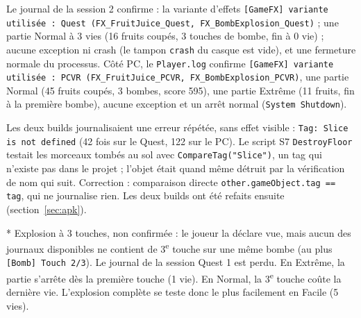 \documentclass[11pt,a4paper]{article}
\newcommand{\fichier}[1]{\texttt{\small #1}}
\begin{document}
Le journal de la session 2 confirme : la variante d'effets \texttt{[GameFX] variante utilisée : Quest
(FX\_FruitJuice\_Quest, FX\_BombExplosion\_Quest)} ; une partie Normal à 3 vies (16 fruits coupés,
3 touches de bombe, fin à 0 vie) ; aucune exception ni crash (le tampon \texttt{crash} du casque est vide),
et une fermeture normale du processus. Côté PC, le \fichier{Player.log} confirme
\texttt{[GameFX] variante utilisée : PCVR (FX\_FruitJuice\_PCVR, FX\_BombExplosion\_PCVR)}, une partie
Normal (45 fruits coupés, 3 bombes, score 595), une partie Extrême (11 fruits, fin à la première bombe),
aucune exception et un arrêt normal (\texttt{System Shutdown}).

Les deux builds journalisaient une erreur répétée, sans effet visible : \texttt{Tag: Slice is not
defined} (42 fois sur le Quest, 122 sur le PC). Le script S7 \texttt{DestroyFloor} testait les morceaux
tombés au sol avec \texttt{CompareTag("Slice")}, un tag qui n'existe pas dans le projet ; l'objet était
quand même détruit par la vérification de nom qui suit. Correction : comparaison directe
\texttt{other.gameObject.tag == tag}, qui ne journalise rien. Les deux builds ont été refaits ensuite
(section~\ref{sec:apk}).

* Explosion à 3 touches, non confirmée : le joueur la déclare vue, mais aucun des journaux
disponibles ne contient de 3\textsuperscript{e} touche sur une même bombe (au plus
\texttt{[Bomb] Touch 2/3}). Le journal de la session Quest 1 est perdu. En Extrême, la partie s'arrête dès la première touche (1 vie). En Normal,
la 3\textsuperscript{e} touche coûte la dernière vie. L'explosion complète se teste donc le plus
facilement en Facile (5 vies).
\end{document}
